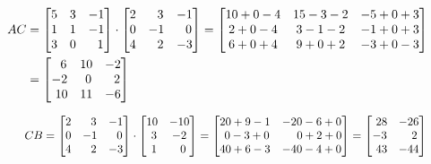 \documentclass[12pt]{amsart}
\begin{document}
\begin{enumerate}
		\begin{align}
		\hspace{0.85cm} AC&=
			\begin{bmatrix}
				5 &3 &-1 \\
				1 &1 &-1 \\
				3 &0 & \text{ } \text{ } 1
			\end{bmatrix} \cdot
			\begin{bmatrix}
				2 &\text{ } \text{ }3 &-1 \\
				0 &-1 &\text{ } \text{ }0 \\
				4 &\text{ } \text{ }2 &-3
			\end{bmatrix}=
			\begin{bmatrix}
				10+0-4 &15-3-2 &-5+0+3 \\
				2+0-4 &3-1-2 &-1+0+3 \\
				6+0+4 &9+0+2 &-3+0-3
			\end{bmatrix}\notag \\
			&=
			\begin{bmatrix}
				\text{ } \text{ }6 &10 &-2 \\
				-2 &\text{ }0 &\text{ } \text{ }2 \\
				\text{ }10 &11 &-6
			\end{bmatrix} \notag
		\end{align}
		
		\begin{align}
		\hspace{1.45cm} CB=
			\begin{bmatrix}
				2 &\text{ } \text{ }3 &-1 \\
				0 &-1 &\text{ } \text{ }0 \\
				4 &\text{ } \text{ }2 &-3
			\end{bmatrix} \cdot
			\begin{bmatrix}
				10 &-10 \\
				\text{ } 3 &-2 \\
				\text{ } 1 &\text{ } \text{ } 0
			\end{bmatrix} =
			\begin{bmatrix}
				20+9-1 &-20-6+0 \\
				\text{ }0-3+0 &\text{ } \text{ } \text{ } \text{ }0+2+0 \\
				40+6-3 &-40-4+0
			\end{bmatrix} =
			\begin{bmatrix}
				\text{ }28 &-26 \\
				-3 &\text{ } \text{ } \text{ }2 \\
				\text{ }43 &-44
			\end{bmatrix} \notag
		\end{align}
		

\end{enumerate}
\end{document}
